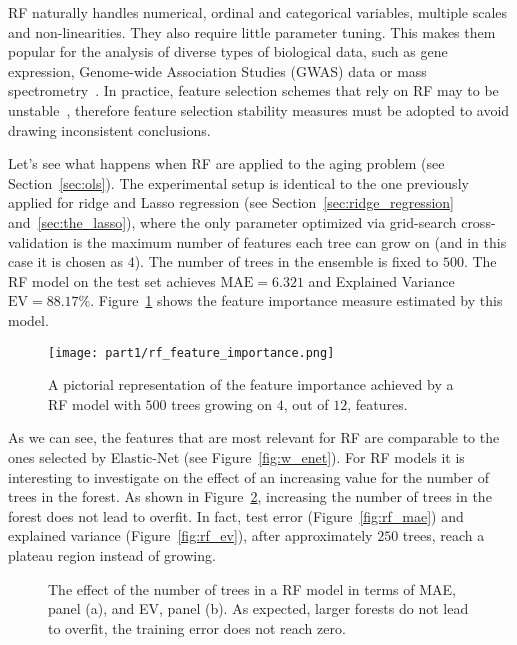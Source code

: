 	    RF naturally handles numerical, ordinal and categorical variables, multiple scales and non-linearities. They also require little parameter tuning. This makes them popular for the analysis of diverse types of biological data, such as gene expression, Genome-wide Association Studies (\ac{GWAS}) data or mass spectrometry~\cite{qi2012random}.
		In practice, feature selection schemes that rely on RF may to be unstable~\cite{kursa2014robustness}, therefore feature selection stability measures must be adopted to avoid drawing inconsistent conclusions.
		
		Let's see what happens when RF are applied to the aging problem (see Section~\ref{sec:ols}). The experimental setup is identical to the one previously applied for ridge and Lasso regression (see Section~\ref{sec:ridge_regression} and~\ref{sec:the_lasso}), where the only parameter optimized via grid-search cross-validation is the maximum number of features each tree can grow on (and in this case it is chosen as $4$). The number of trees in the ensemble is fixed to $500$. The RF model on the test set achieves $\text{MAE} = 6.321$ and Explained Variance $\text{EV} = 88.17\%$.
		Figure~\ref{fig:rf_feature_importance} shows the feature importance measure estimated by this model.
		
		\begin{figure}[]
			\centering
			\texttt{[image: part1/rf\_feature\_importance.png]}
			\caption{A pictorial representation of the feature importance achieved by a RF model with $500$ trees growing on $4$, out of $12$, features.} \label{fig:rf_feature_importance}
		\end{figure}

		As we can see, the features that are most relevant for RF are comparable to the ones selected by Elastic-Net (see Figure~\ref{fig:w_enet}).
		For RF models it is interesting to investigate on the effect of an increasing value for the number of trees in the forest. As shown in Figure~\ref{fig:rf_increasing}, increasing the number of trees in the forest does not lead to overfit. In fact, test error (Figure~\ref{fig:rf_mae}) and explained variance (Figure~\ref{fig:rf_ev}), after approximately $250$ trees, reach a plateau region instead of growing.
		
	    \begin{figure}[]
			\centering
			\hfill%
			\caption{The effect of the number of trees in a RF model in terms of MAE, panel (a), and EV, panel (b). As expected, larger forests do not lead to overfit, \ie the training error does not reach zero.}\label{fig:rf_increasing}
		\end{figure}


